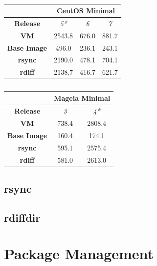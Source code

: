 \begin{table}[h]
\centering
    \begin{tabular}{| c | c | c | c |}
    \hline
& \multicolumn{3}{|c|}{\bfseries CentOS Minimal} \\ \hline
    \bfseries Release & \itshape 5* & \itshape 6 & \itshape 7 \\ \hline
    \bfseries VM & 2543.8 &  676.0 & 881.7\\ \hline
    \bfseries Base Image & 496.0 & 236.1 & 243.1\\ \hline
    \bfseries rsync & 2190.0 & 478.1 & 704.1\\ \hline 
    \bfseries rdiff & 2138.7 & 416.7 & 621.7\\ \hline 
    \end{tabular}
\caption{}
\label{table:diff}
\end{table}

\begin{table}[h]
\centering
    \begin{tabular}{| c | c | c |}
    \hline
& \multicolumn{2}{|c|}{\bfseries Mageia Minimal} \\ \hline
    \bfseries Release & \itshape 3 & \itshape 4*  \\ \hline
    \bfseries VM & 738.4 & 2808.4 \\ \hline
    \bfseries Base Image & 160.4 & 174.1\\ \hline
    \bfseries rsync & 595.1 & 2575.4\\ \hline 
    \bfseries rdiff & 581.0 & 2613.0\\ \hline 
    \end{tabular}
\caption{}
\label{table:diff}
\end{table}



\subsection{rsync}

\subsection{rdiffdir}
\section{Package Management}

